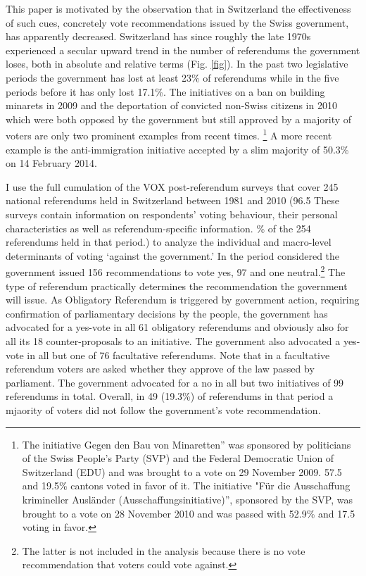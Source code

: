 \documentclass[11pt,a4paper]{article}\usepackage[]{graphicx}\usepackage[]{color}
\begin{document}
    This paper is motivated by the observation that in Switzerland the effectiveness of such cues, concretely vote recommendations issued by the Swiss government, has apparently decreased. Switzerland has since roughly the late 1970s experienced a secular upward trend in the number of referendums the government loses, both in absolute and relative terms (Fig. \ref{fig}). In the past two legislative periods the government has lost at least 23\% of referendums while in the five periods before it has only lost 17.1\%. 
    The initiatives on a ban on building minarets in 2009 and the deportation of convicted non-Swiss citizens in 2010 which were both opposed by the government but still approved by a majority of voters are only two prominent examples from recent times. \footnote{The initiative Gegen den Bau von Minaretten'' was sponsored by politicians of the Swiss People's Party (SVP) and the Federal Democratic Union of Switzerland (EDU) and was brought to a vote on 29 November 2009. 57.5 and 19.5\% cantons voted in favor of it. 
    The initiative "Für die Ausschaffung krimineller Ausländer (Ausschaffungsinitiative)'', sponsored by the SVP, was brought to a vote on 28 November 2010 and was passed with 52.9\% and  
    17.5 voting in favor. } A more recent example is the anti-immigration initiative accepted by a slim majority of 50.3\% on 14 February 2014.
    
    I use the full cumulation of the VOX post-referendum surveys that cover 245 national referendums held in Switzerland between 1981 and 2010 (96.5 
    These surveys contain information on respondents’ voting behaviour, their personal characteristics as well as referendum-specific information.
    \% of the 254 referendums held in that period.) to analyze the individual and macro-level determinants of voting `against the government.' In the period considered the government issued 156 recommendations to vote yes, 97 and one neutral.\footnote{The latter is not included in the analysis because there is no vote recommendation that voters could vote against.} The type of referendum practically determines the recommendation the government will issue. As Obligatory Referendum is triggered by government action, requiring confirmation of parliamentary decisions by the people, the government has advocated for a yes-vote in all 61 obligatory referendums and obviously also for all its 18 counter-proposals to an initiative. The government also advocated a yes-vote in all but one of  76 facultative referendums. Note that in a facultative referendum voters are asked whether they approve of the law passed by parliament. The government advocated for a no in all but two initiatives of 99 referendums in total. Overall, in 49 (19.3\%) of referendums in that period a mjaority of voters did not follow the government's vote recommendation.  
    
\end{document}
